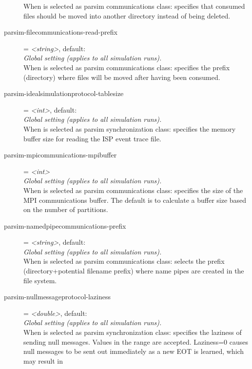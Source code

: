 \begin{description}
    When  is selected as parsim communications
    class: specifies that consumed files should be moved into another directory
    instead of being deleted.
\item[parsim-filecommunications-read-prefix] = \textit{<string>}, default: \\
    \textit{Global setting (applies to all simulation runs).}\\
    When  is selected as parsim communications
    class: specifies the prefix (directory) where files will be moved after
    having been consumed.
\item[parsim-idealsimulationprotocol-tablesize] = \textit{<int>}, default: \\
    \textit{Global setting (applies to all simulation runs).}\\
    When  is selected as parsim
    synchronization class: specifies the memory buffer size for reading the ISP
    event trace file.
\item[parsim-mpicommunications-mpibuffer] = \textit{<int>}\\
    \textit{Global setting (applies to all simulation runs).}\\
    When  is selected as parsim communications class:
    specifies the size of the MPI communications buffer. The default is to
    calculate a buffer size based on the number of partitions.
\item[parsim-namedpipecommunications-prefix] = \textit{<string>}, default: \\
    \textit{Global setting (applies to all simulation runs).}\\
    When  is selected as parsim
    communications class: selects the prefix (directory+potential filename
    prefix) where name pipes are created in the file system.
\item[parsim-nullmessageprotocol-laziness] = \textit{<double>}, default: \\
    \textit{Global setting (applies to all simulation runs).}\\
    When  is selected as parsim synchronization
    class: specifies the laziness of sending null messages. Values in the range
    \ttt{[0,{\allowbreak}1)} are accepted. Laziness=0 causes null messages to
    be sent out immediately as a new EOT is learned, which may result in

\end{description}
